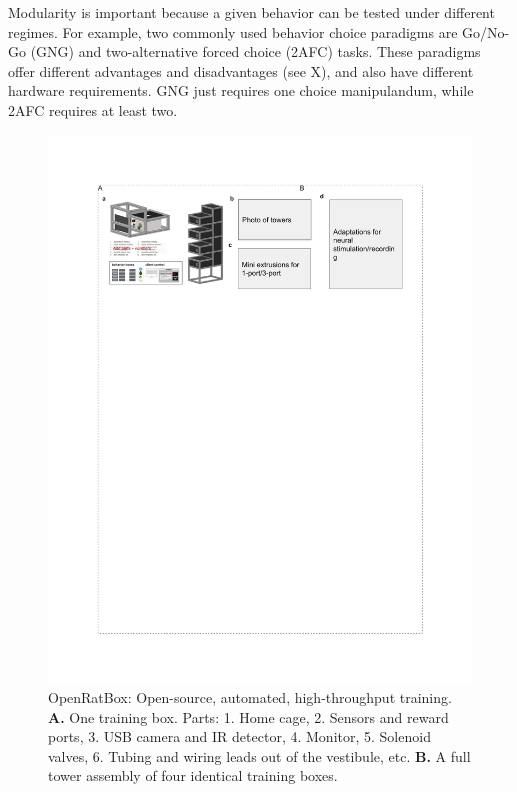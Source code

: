 Modularity is important because a given behavior can be tested under different regimes. For example, two commonly used behavior choice paradigms are Go/No-Go (GNG) and two-alternative forced choice (2AFC) tasks. These paradigms offer different advantages and disadvantages (see X), and also have different hardware requirements. GNG just requires one choice manipulandum, while 2AFC requires at least two.

\begin{figure}[t!]
    \includegraphics[width=\textwidth]{figures/chapter_1/fig_1-1_openratbox/openratbox.pdf}
    \vspace{.1in}
    \caption[OpenRatBox]{OpenRatBox: Open-source, automated, high-throughput training. \textbf{A.} One training box. Parts: 1. Home cage, 2. Sensors and reward ports, 3. USB camera and IR detector, 4. Monitor, 5. Solenoid valves, 6. Tubing and wiring leads out of the vestibule, etc. \textbf{B.} A full tower assembly of four identical training boxes. 
    \label{fig:openratbox}}
\end{figure}

